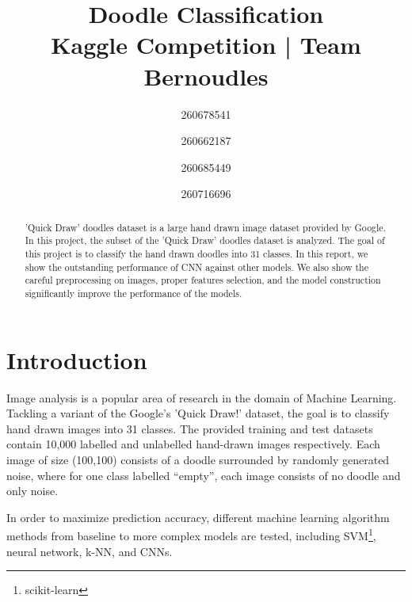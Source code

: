 \documentclass[conference]{IEEEtran}
\begin{document}
\title{Doodle Classification
	\\ \small{Kaggle Competition | Team Bernoudles}
}

\author{
	\hspace{1px} 260678541 \\
	\and
	\hspace{1px} 260662187 \\
	\and
	\hspace{1px} 260685449 \\
	\and
	\hspace{1px} 260716696 \\
}

\maketitle
\begin{abstract}
'Quick Draw' doodles dataset is a large hand drawn image dataset provided by Google. In this project, the subset of the 'Quick Draw' doodles dataset is analyzed. The goal of this project is to classify the hand drawn doodles into 31 classes. In this report, we show the outstanding performance of CNN against other models. We also show the careful preprocessing on images, proper features selection, and the model construction significantly improve the performance of the models. 
\end{abstract}

\section{Introduction}
Image analysis is a popular area of research in the domain of Machine Learning. Tackling a variant of the Google's 'Quick Draw!' dataset, the goal is to classify hand drawn images into 31 classes. The provided training and test datasets contain 10,000 labelled and unlabelled hand-drawn images respectively. Each image of size (100,100) consists of a doodle surrounded by randomly generated noise, where for one class labelled “empty”, each image consists of no doodle and only noise. 

In order to maximize prediction accuracy, different machine learning algorithm methods from baseline to more complex models are tested, including SVM\footnote{scikit-learn}, neural network, k-NN, and CNNs.
\end{document}
